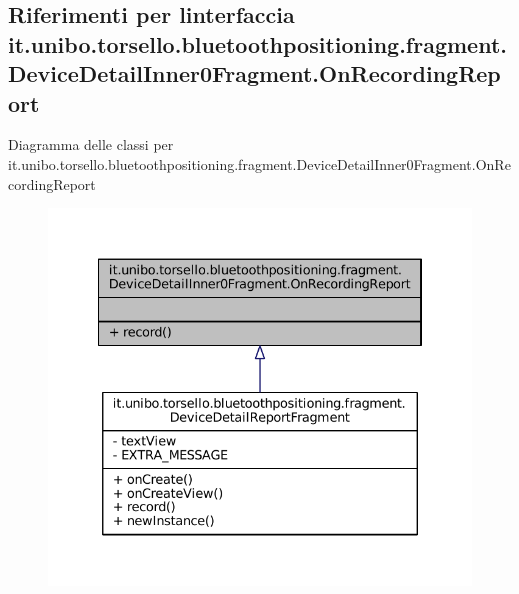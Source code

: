 \hypertarget{interfaceit_1_1unibo_1_1torsello_1_1bluetoothpositioning_1_1fragment_1_1DeviceDetailInner0Fragment_1_1OnRecordingReport}{}\subsection{Riferimenti per l\textquotesingle{}interfaccia it.\+unibo.\+torsello.\+bluetoothpositioning.\+fragment.\+Device\+Detail\+Inner0\+Fragment.\+On\+Recording\+Report}
\label{interfaceit_1_1unibo_1_1torsello_1_1bluetoothpositioning_1_1fragment_1_1DeviceDetailInner0Fragment_1_1OnRecordingReport}


Diagramma delle classi per it.\+unibo.\+torsello.\+bluetoothpositioning.\+fragment.\+Device\+Detail\+Inner0\+Fragment.\+On\+Recording\+Report
\nopagebreak
\begin{figure}[H]
\begin{center}
\leavevmode
\includegraphics[width=334pt]{interfaceit_1_1unibo_1_1torsello_1_1bluetoothpositioning_1_1fragment_1_1DeviceDetailInner0Fragme771da81ee79947fcb94bf26bc1164f62}
\end{center}
\end{figure}


